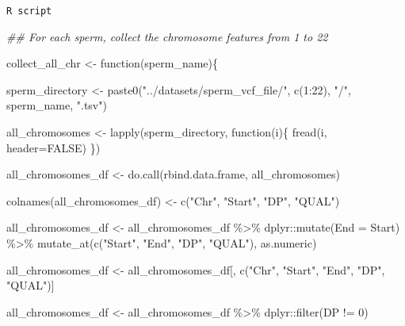 \documentclass[
  letterpaper,
  DIV=11,
  numbers=noendperiod]{scrreprt}
\newenvironment{Shaded}{\begin{snugshade}}{\end{snugshade}}
\newcommand{\AttributeTok}[1]{\textcolor[rgb]{0.40,0.45,0.13}{#1}}
\newcommand{\ConstantTok}[1]{\textcolor[rgb]{0.56,0.35,0.01}{#1}}
\newcommand{\ControlFlowTok}[1]{\textcolor[rgb]{0.00,0.23,0.31}{#1}}
\newcommand{\DecValTok}[1]{\textcolor[rgb]{0.68,0.00,0.00}{#1}}
\newcommand{\DocumentationTok}[1]{\textcolor[rgb]{0.37,0.37,0.37}{\textit{#1}}}
\newcommand{\FunctionTok}[1]{\textcolor[rgb]{0.28,0.35,0.67}{#1}}
\newcommand{\NormalTok}[1]{\textcolor[rgb]{0.00,0.23,0.31}{#1}}
\newcommand{\OtherTok}[1]{\textcolor[rgb]{0.00,0.23,0.31}{#1}}
\newcommand{\SpecialCharTok}[1]{\textcolor[rgb]{0.37,0.37,0.37}{#1}}
\newcommand{\StringTok}[1]{\textcolor[rgb]{0.13,0.47,0.30}{#1}}
\begin{document}
\begin{codelisting}

\caption{\texttt{R script}}

\begin{Shaded}
\begin{Highlighting}[]
\DocumentationTok{\#\# For each sperm, collect the chromosome features from 1 to 22}

\NormalTok{collect\_all\_chr }\OtherTok{\textless{}{-}} \ControlFlowTok{function}\NormalTok{(sperm\_name)\{}
  
\NormalTok{  sperm\_directory }\OtherTok{\textless{}{-}} \FunctionTok{paste0}\NormalTok{(}\StringTok{"../datasets/sperm\_vcf\_file/"}\NormalTok{, }\FunctionTok{c}\NormalTok{(}\DecValTok{1}\SpecialCharTok{:}\DecValTok{22}\NormalTok{), }\StringTok{"/"}\NormalTok{, sperm\_name, }\StringTok{".tsv"}\NormalTok{)}
  
\NormalTok{  all\_chromosomes }\OtherTok{\textless{}{-}} \FunctionTok{lapply}\NormalTok{(sperm\_directory, }\ControlFlowTok{function}\NormalTok{(i)\{}
  \FunctionTok{fread}\NormalTok{(i, }\AttributeTok{header=}\ConstantTok{FALSE}\NormalTok{)}
\NormalTok{  \})}
  
\NormalTok{  all\_chromosomes\_df }\OtherTok{\textless{}{-}} \FunctionTok{do.call}\NormalTok{(rbind.data.frame, all\_chromosomes)}
  
  \FunctionTok{colnames}\NormalTok{(all\_chromosomes\_df) }\OtherTok{\textless{}{-}} \FunctionTok{c}\NormalTok{(}\StringTok{"Chr"}\NormalTok{, }\StringTok{"Start"}\NormalTok{, }\StringTok{"DP"}\NormalTok{, }\StringTok{"QUAL"}\NormalTok{)}
  
\NormalTok{  all\_chromosomes\_df }\OtherTok{\textless{}{-}}\NormalTok{ all\_chromosomes\_df }\SpecialCharTok{\%\textgreater{}\%}\NormalTok{ dplyr}\SpecialCharTok{::}\FunctionTok{mutate}\NormalTok{(}\AttributeTok{End =}\NormalTok{ Start) }\SpecialCharTok{\%\textgreater{}\%} 
                        \FunctionTok{mutate\_at}\NormalTok{(}\FunctionTok{c}\NormalTok{(}\StringTok{"Start"}\NormalTok{, }\StringTok{"End"}\NormalTok{, }\StringTok{"DP"}\NormalTok{, }\StringTok{"QUAL"}\NormalTok{), as.numeric)}
  
  
\NormalTok{  all\_chromosomes\_df }\OtherTok{\textless{}{-}}\NormalTok{ all\_chromosomes\_df[, }\FunctionTok{c}\NormalTok{(}\StringTok{"Chr"}\NormalTok{, }\StringTok{"Start"}\NormalTok{, }\StringTok{"End"}\NormalTok{, }\StringTok{"DP"}\NormalTok{, }\StringTok{"QUAL"}\NormalTok{)]}
  
  
\NormalTok{  all\_chromosomes\_df }\OtherTok{\textless{}{-}}\NormalTok{ all\_chromosomes\_df }\SpecialCharTok{\%\textgreater{}\%}\NormalTok{ dplyr}\SpecialCharTok{::}\FunctionTok{filter}\NormalTok{(DP }\SpecialCharTok{!=} \DecValTok{0}\NormalTok{)}
  

\end{Highlighting}
\end{Shaded}
\end{codelisting}
\end{document}
